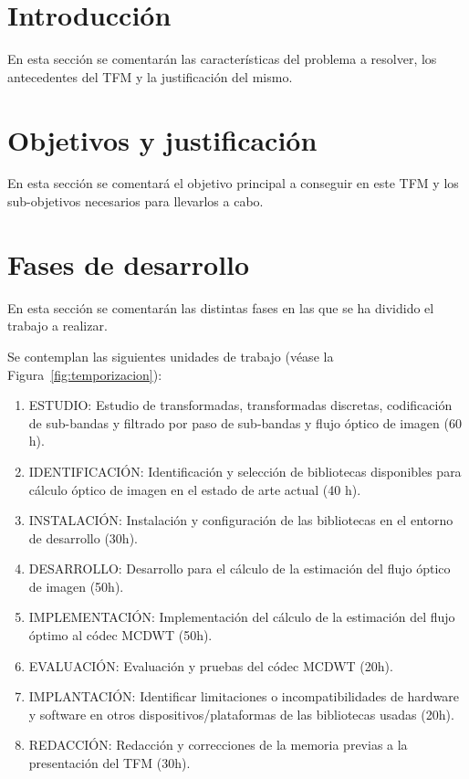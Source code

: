 \documentclass[titlepage, 12pt, a4paper, oneside]{article}
\begin{document}
\normalsize

\section{Introducción}
\cite{einstein1922kosmologische}
En esta sección se comentarán las características del problema a resolver, los antecedentes del TFM y la justificación del mismo.

\section{Objetivos y justificación}
En esta sección se comentará el objetivo principal a conseguir en este TFM y los sub-objetivos necesarios para llevarlos a cabo.

\section{Fases de desarrollo}
En esta sección se comentarán las distintas fases en las que se ha dividido el trabajo a realizar.

Se contemplan las siguientes unidades de trabajo (véase la Figura~\ref{fig:temporizacion}):
\begin{enumerate}
  \item {ESTUDIO:} Estudio de transformadas, transformadas discretas,
    codificación de sub-bandas y filtrado por paso de sub-bandas y
    flujo óptico de imagen (60 h).
  \item {IDENTIFICACIÓN}: Identificación y selección de bibliotecas disponibles para
    cálculo óptico de imagen en el estado de arte actual (40 h).
  \item {INSTALACIÓN}: Instalación y configuración de las bibliotecas en el entorno
    de desarrollo (30h).
  \item {DESARROLLO}: Desarrollo para el cálculo de la estimación del flujo óptico
    de imagen (50h).
  \item {IMPLEMENTACIÓN}: Implementación del cálculo de la estimación del flujo óptimo
    al códec MCDWT (50h).
  \item {EVALUACIÓN}: Evaluación y pruebas del códec MCDWT (20h).
  \item {IMPLANTACIÓN}: Identificar limitaciones o incompatibilidades de hardware y
    software en otros dispositivos/plataformas de las bibliotecas
    usadas (20h).
  \item {REDACCIÓN}: Redacción y correcciones de la memoria previas a la
    presentación del TFM (30h).
\end{enumerate}
\end{document}
